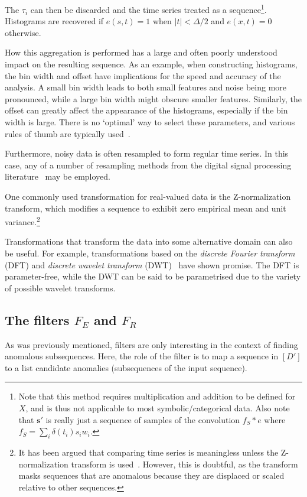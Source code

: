 The $\tau_i$ can then be discarded and the time series treated as a sequence\footnote{Note that this method requires multiplication and addition to be defined for $X$, and is thus not applicable to most symbolic/categorical data. Also note that $\mathbf{s}'$ is really just a sequence of samples of the convolution $f_S \ast e$ where $f_S = \sum_i \delta(t_i) s_i w_i$.}. Histograms are recovered if $e(s, t) = 1$ when $|t| < \Delta/2$ and $e(x, t) = 0$ otherwise.

How this aggregation is performed has a large and often poorly understood impact on the resulting sequence. As an example, when constructing histograms, the bin width and offset have implications for the speed and accuracy of the analysis. A small bin width leads to both small features and noise being more pronounced, while a large bin width might obscure smaller features. Similarly, the offset can greatly affect the appearance of the histograms, especially if the bin width is large. There is no `optimal' way to select these parameters, and various rules of thumb are typically used~\cite{density_estimation}.

Furthermore, noisy data is often resampled to form regular time series. In this case, any of a number of resampling methods from the digital signal processing literature~\cite{TODO} may be employed.

One commonly used transformation for real-valued data is the Z-normalization transform, which modifies a sequence to exhibit zero empirical mean and unit variance.\footnote{It has been argued that comparing time series is meaningless unless the Z-normalization transform is used~\cite{keogh5}. However, this is doubtful, as the transform masks sequences that are anomalous because they are displaced or scaled relative to other sequences.}

Transformations that transform the data into some alternative domain can also be useful. For example, transformations based on the \emph{discrete Fourier transform} (DFT) and \emph{discrete wavelet transform} (DWT)~\cite{fu} have shown promise. The DFT is parameter-free, while the DWT can be said to be parametrised due to the variety of possible wavelet transforms.

\subsection{The filters $F_E$ and $F_R$}

As was previously mentioned, filters are only interesting in the context of finding anomalous subsequences. Here, the role of the filter is to map a sequence in $[D']$ to a list candidate anomalies (subsequences of the input sequence).

